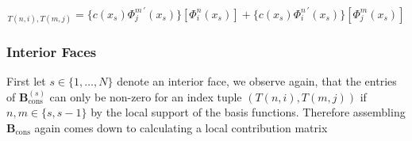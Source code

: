 \begin{equation*}
	[\textbf{B}_{\text{cons}}^{(s)}]_{T(n,i),T(m,j)} = \{c(x_s) \Phi_j^{m \, \prime} (x_s)\}[\Phi_i^n(x_s)] + \{c(x_s)\Phi_i^{n\, \prime} (x_s)\}[\Phi_j^m(x_s)]
\end{equation*}

\subsubsection{Interior Faces}
First let $s \in \{1,\ldots,N\}$ denote an interior face, we observe again, that the entries of
$\textbf{B}_{\text{cons}}^{(s)}$ can only be non-zero for an index tuple $(T(n,i),T(m,j))$ if
$n,m \in \{s, s-1\}$ by the local support of the basis functions.
Therefore assembling $ \textbf{B}_{\text{cons}}$ again comes down to calculating a local contribution matrix


